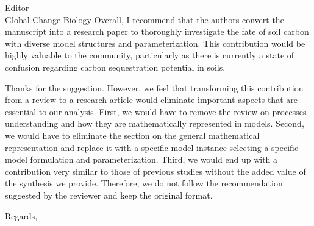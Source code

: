 \documentclass[11pt]{bgcletter}
\newcommand{\answer}[1] {
{\color{cyan} #1}
}
\begin{document}
\begin{letter}{Editor\\
   Global Change Biology
}
Overall, I recommend that the authors convert the manuscript into a research paper to thoroughly investigate the fate of soil carbon with diverse model structures and parameterization. This contribution would be highly valuable to the community, particularly as there is currently a state of confusion regarding carbon sequestration potential in soils.

\answer{Thanks for the suggestion. However, we feel that transforming this contribution from a review to a research article would eliminate important aspects that are essential to our analysis. First, we would have to remove the review on processes understanding and how they are mathematically represented in models. Second, we would have to eliminate the section on the general mathematical representation and replace it with a specific model instance selecting a specific model formulation and parameterization. Third, we would end up with a contribution very similar to those of previous studies without the added value of the synthesis we provide. Therefore, we do not follow the recommendation suggested by the reviewer and keep the original format.}

 \closing{Regards,} 
 \end{letter}

 
\end{document}
